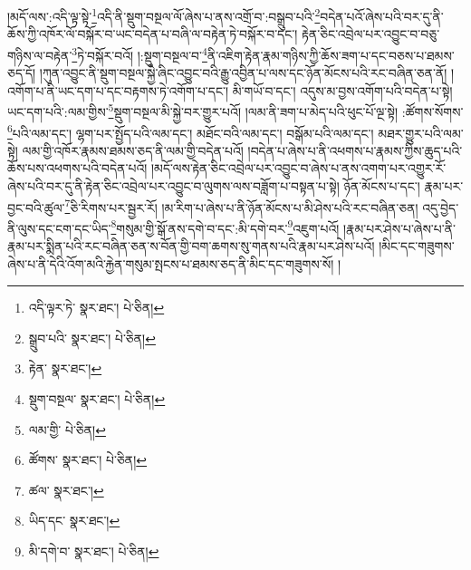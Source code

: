 །མདོ་ལས་:འདི་ལྟ་སྟེ་\footnote{འདི་ལྟར་ཏེ་  སྣར་ཐང་།  པེ་ཅིན། }འདི་ནི་སྡུག་བསྔལ་ལོ་ཞེས་པ་ནས་འགྲོ་བ་:བསྒྲུབ་པའི་\footnote{སྒྲུབ་པའི་  སྣར་ཐང་།  པེ་ཅིན། }བདེན་པའོ་ཞེས་པའི་བར་དུ་ནི་ཆོས་ཀྱི་འཁོར་ལོ་བསྐོར་བ་ཡང་བདེན་པ་བཞི་ལ་བརྟེན་ཏེ་བསྐོར་བ་དང་། རྟེན་ཅིང་འབྲེལ་པར་འབྱུང་བ་བཅུ་གཉིས་ལ་བརྟེན་\footnote{རྟེན་  སྣར་ཐང་། }ཏེ་བསྐོར་བའོ། །:སྡུག་བསྔལ་བ་\footnote{སྡུག་བསྔལ་  སྣར་ཐང་།  པེ་ཅིན། }ནི་འཇིག་རྟེན་རྣམ་གཉིས་ཀྱི་ཆོས་ཟག་པ་དང་བཅས་པ་ཐམས་ཅད་དོ། །ཀུན་འབྱུང་ནི་སྡུག་བསྔལ་སྐྱེ་ཞིང་འབྱུང་བའི་རྒྱུ་འབྱིན་པ་ལས་དང་ཉོན་མོངས་པའི་རང་བཞིན་ཅན་ནོ། །འགོག་པ་ནི་ཡང་དག་པ་དང་བརྟགས་ཏེ་འགོག་པ་དང་། མི་གཡོ་བ་དང་། འདུས་མ་བྱས་འགོག་པའི་བདེན་པ་སྟེ། ཡང་དག་པའི་:ལམ་གྱིས་\footnote{ལམ་གྱི་  པེ་ཅིན། }སྡུག་བསྔལ་མི་སྐྱེ་བར་གྱུར་པའོ། །ལམ་ནི་ཟག་པ་མེད་པའི་ཕུང་པོ་ལྔ་སྟེ། :ཚོགས་སོགས་\footnote{ཚོགས་  སྣར་ཐང་།  པེ་ཅིན། }པའི་ལམ་དང་། ལྷག་པར་སྤྱོད་པའི་ལམ་དང་། མཐོང་བའི་ལམ་དང་། བསྒོམ་པའི་ལམ་དང་། མཐར་གྱུར་པའི་ལམ་སྟེ། ལམ་གྱི་འཁོར་རྣམས་ཐམས་ཅད་ནི་ལམ་གྱི་བདེན་པའོ། །བདེན་པ་ཞེས་པ་ནི་འཕགས་པ་རྣམས་ཀྱིས་ཆུད་པའི་ཆོས་པས་འཕགས་པའི་བདེན་པའོ། །མདོ་ལས་རྟེན་ཅིང་འབྲེལ་པར་འབྱུང་བ་ཞེས་པ་ནས་འགག་པར་འགྱུར་རོ་ཞེས་པའི་བར་དུ་ནི་རྟེན་ཅིང་འབྲེལ་པར་འབྱུང་བ་ལུགས་ལས་བཟློག་པ་བསྟན་པ་སྟེ། ཉོན་མོངས་པ་དང་། རྣམ་པར་བྱང་བའི་ཚུལ་\footnote{ཚལ་  སྣར་ཐང་། }ཅི་རིགས་པར་སྦྱར་རོ། །མ་རིག་པ་ཞེས་པ་ནི་ཉོན་མོངས་པ་མི་ཤེས་པའི་རང་བཞིན་ཅན། འདུ་བྱེད་ནི་ལུས་དང་ངག་དང་ཡིད་\footnote{ཡིད་དང་  སྣར་ཐང་། }གསུམ་གྱི་སྒོ་ནས་དགེ་བ་དང་:མི་དགེ་བར་\footnote{མི་དགེ་བ་  སྣར་ཐང་།  པེ་ཅིན། }འཇུག་པའོ། །རྣམ་པར་ཤེས་པ་ཞེས་པ་ནི་རྣམ་པར་སྨིན་པའི་རང་བཞིན་ཅན་ས་བོན་གྱི་བག་ཆགས་སུ་གནས་པའི་རྣམ་པར་ཤེས་པའོ། །མིང་དང་གཟུགས་ཞེས་པ་ནི་དེའི་འོག་མའི་རྐྱེན་གསུམ་སྤངས་པ་ཐམས་ཅད་ནི་མིང་དང་གཟུགས་སོ། །
